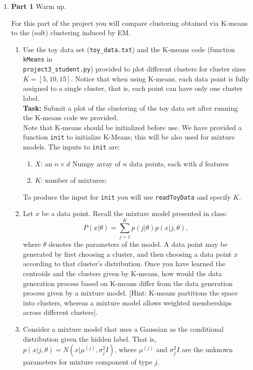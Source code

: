 \begin{enumerate}

\item {\bf Part 1} Warm up.

For this part of the project you will compare clustering obtained via K-means to the (soft) clustering induced by EM.

\begin{enumerate}
  \item Use the toy data set (\texttt{toy\_data.txt}) and the K-means code (function \texttt{kMeans} in\\ \texttt{project3\_student.py}) provided to plot different clusters for cluster sizes $K = [5, 10, 15]$. Notice that when using K-means, each data point is fully assigned to a single cluster, that is, each point can have only one cluster label.\\
  \textbf{Task:} Submit a plot of the clustering of the toy data set after running the K-means code we provided.\\
  Note that K-means should be initialized before use. We have provided a function \texttt{init} to initialize K-Means; this will be also used for mixture models. The inputs to \texttt{init} are:
  \begin{enumerate}
  \item $X$: an $n \times d$ Numpy array of $n$ data points, each with $d$ features
  \item $K$: number of mixtures;
  \end{enumerate}
  To produce the input for \texttt{init} you will use \texttt{readToyData} and specify $K$. 

  \item Let $x$ be a data point. Recall the mixture model presented in class: $$P(x | \theta) = \sum^{K}_{j=1} p(j| \theta)p(x | j, \theta),$$ where $\theta$ denotes the parameters of the model. A data point may be generated by first choosing a cluster, and then choosing a data point $x$ according to that cluster's distribution. Once you have learned the centroids and the clusters given by K-means, how would the data generation process based on K-means differ from the data generation process given by a mixture model. [Hint: K-means partitions the space into clusters, whereas a mixture model allows weighted memberships across different clusters].
  \item Consider a mixture model that uses a Gaussian as the conditional distribution given the hidden label. That is, $p(x | j, \theta) = N(x | \mu^{(j)}, \sigma^2_{j} I)$, where $\mu^{(j)}$ and $\sigma^2_jI$ are the unknown parameters for mixture component of type $j$.


\end{enumerate}
\end{enumerate}
